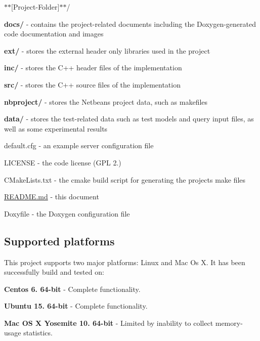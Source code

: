 \begin{DoxyItemize}
\item $\ast$$\ast${\ttfamily \mbox{[}Project-\/\+Folder\mbox{]}}$\ast$$\ast$/
\begin{DoxyItemize}
\item {\bfseries docs/} -\/ contains the project-\/related documents including the Doxygen-\/generated code documentation and images
\item {\bfseries ext/} -\/ stores the external header only libraries used in the project
\item {\bfseries inc/} -\/ stores the C++ header files of the implementation
\item {\bfseries src/} -\/ stores the C++ source files of the implementation
\item {\bfseries nbproject/} -\/ stores the Netbeans project data, such as makefiles
\item {\bfseries data/} -\/ stores the test-\/related data such as test models and query input files, as well as some experimental results
\item default.\+cfg -\/ an example server configuration file
\item L\+I\+C\+E\+N\+S\+E -\/ the code license (G\+P\+L 2.)
\item C\+Make\+Lists.\+txt -\/ the cmake build script for generating the project\textquotesingle{}s make files
\item \hyperlink{_r_e_a_d_m_e_8md}{R\+E\+A\+D\+M\+E.\+md} -\/ this document
\item Doxyfile -\/ the Doxygen configuration file
\end{DoxyItemize}
\end{DoxyItemize}

\subsection*{Supported platforms}

This project supports two major platforms\+: Linux and Mac Os X. It has been successfully build and tested on\+:


\begin{DoxyItemize}
\item {\bfseries Centos 6. 64-\/bit} -\/ Complete functionality.
\item {\bfseries Ubuntu 15. 64-\/bit} -\/ Complete functionality.
\item {\bfseries Mac O\+S X Yosemite 10. 64-\/bit} -\/ Limited by inability to collect memory-\/usage statistics.
\end{DoxyItemize}

